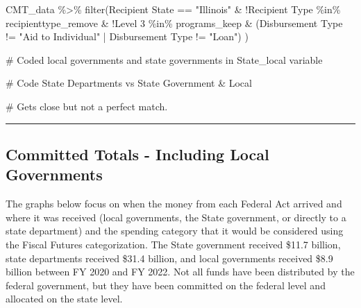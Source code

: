 \documentclass[
  letterpaper,
  DIV=11,
  numbers=noendperiod]{scrreport}
\newenvironment{Shaded}{\begin{snugshade}}{\end{snugshade}}
\newcommand{\AttributeTok}[1]{\textcolor[rgb]{0.40,0.45,0.13}{#1}}
\newcommand{\CommentTok}[1]{\textcolor[rgb]{0.37,0.37,0.37}{#1}}
\newcommand{\FunctionTok}[1]{\textcolor[rgb]{0.28,0.35,0.67}{#1}}
\newcommand{\NormalTok}[1]{\textcolor[rgb]{0.00,0.23,0.31}{#1}}
\newcommand{\SpecialCharTok}[1]{\textcolor[rgb]{0.37,0.37,0.37}{#1}}
\newcommand{\StringTok}[1]{\textcolor[rgb]{0.13,0.47,0.30}{#1}}
\begin{document}
\begin{Shaded}
\begin{Highlighting}[]
\NormalTok{CMT\_data }\SpecialCharTok{\%\textgreater{}\%} 
  \FunctionTok{filter}\NormalTok{(}\StringTok{\textasciigrave{}}\AttributeTok{Recipient State}\StringTok{\textasciigrave{}} \SpecialCharTok{==} \StringTok{"Illinois"} \SpecialCharTok{\&} 
      \SpecialCharTok{!}\StringTok{\textasciigrave{}}\AttributeTok{Recipient Type}\StringTok{\textasciigrave{}} \SpecialCharTok{\%in\%}\NormalTok{ recipienttype\_remove }\SpecialCharTok{\&}
        \SpecialCharTok{!}\StringTok{\textasciigrave{}}\AttributeTok{Level 3}\StringTok{\textasciigrave{}} \SpecialCharTok{\%in\%}\NormalTok{ programs\_keep }\SpecialCharTok{\&}
\NormalTok{    (}\StringTok{\textasciigrave{}}\AttributeTok{Disbursement Type}\StringTok{\textasciigrave{}} \SpecialCharTok{!=} \StringTok{"Aid to Individual"} \SpecialCharTok{|} \StringTok{\textasciigrave{}}\AttributeTok{Disbursement Type}\StringTok{\textasciigrave{}} \SpecialCharTok{!=} \StringTok{"Loan"}\NormalTok{)}
\NormalTok{  )}

\CommentTok{\# Coded local governments and state governments in  State\_local variable}

\CommentTok{\# Code State Departments vs State Government \& Local}


\CommentTok{\# Gets  close but not a perfect match.}
\end{Highlighting}
\end{Shaded}

\begin{center}\rule{0.5\linewidth}{0.5pt}\end{center}

\hypertarget{committed-totals---including-local-governments}{%
\subsection{Committed Totals - Including Local
Governments}\label{committed-totals---including-local-governments}}

The graphs below focus on when the money from each Federal Act arrived
and where it was received (local governments, the State government, or
directly to a state department) and the spending category that it would
be considered using the Fiscal Futures categorization. The State
government received \$11.7 billion, state departments received \$31.4
billion, and local governments received \$8.9 billion between FY 2020
and FY 2022. Not all funds have been distributed by the federal
government, but they have been committed on the federal level and
allocated on the state level.
\end{document}
